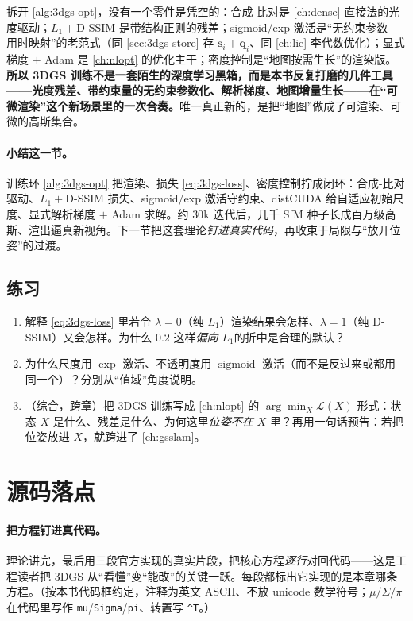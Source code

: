 \begin{insight}
拆开 \cref{alg:3dgs-opt}，没有一个零件是凭空的：合成-比对是 \cref{ch:dense} 直接法的光度驱动；$L_1+$D-SSIM 是带结构正则的残差；sigmoid/exp 激活是“无约束参数 $+$ 用时映射”的老范式（同 \cref{sec:3dgs-store} 存 $\mathbf s_i+\mathbf q_i$、同 \cref{ch:lie} 李代数优化）；显式梯度 $+$ Adam 是 \cref{ch:nlopt} 的优化主干；密度控制是“地图按需生长”的渲染版。\textbf{所以 3DGS 训练不是一套陌生的深度学习黑箱，而是本书反复打磨的几件工具——光度残差、带约束量的无约束参数化、解析梯度、地图增量生长——在“可微渲染”这个新场景里的一次合奏。}唯一真正新的，是把“地图”做成了可渲染、可微的高斯集合。
\end{insight}

\paragraph{小结这一节。}
训练环 \cref{alg:3dgs-opt} 把渲染、损失 \cref{eq:3dgs-loss}、密度控制拧成闭环：合成-比对驱动、$L_1+$D-SSIM 损失、sigmoid/exp 激活守约束、distCUDA 给自适应初始尺度、显式解析梯度 $+$ Adam 求解。约 $30$k 迭代后，几千 SfM 种子长成百万级高斯、渲出逼真新视角。下一节把这套理论\emph{钉进真实代码}，再收束于局限与“放开位姿”的过渡。

\subsection*{练习}
\begin{enumerate}
  \item 解释 \cref{eq:3dgs-loss} 里若令 $\lambda=0$（纯 $L_1$）渲染结果会怎样、$\lambda=1$（纯 D-SSIM）又会怎样。为什么 $0.2$ 这样\emph{偏向 $L_1$}的折中是合理的默认？
  \item 为什么尺度用 $\exp$ 激活、不透明度用 $\operatorname{sigmoid}$ 激活（而不是反过来或都用同一个）？分别从“值域”角度说明。
  \item （综合，跨章）把 3DGS 训练写成 \cref{ch:nlopt} 的 $\arg\min_X\mathcal L(X)$ 形式：状态 $X$ 是什么、残差是什么、为何这里\emph{位姿不在} $X$ 里？再用一句话预告：若把位姿放进 $X$，就跨进了 \cref{ch:gsslam}。
\end{enumerate}

\section{源码落点}
\label{sec:3dgs-code}

\paragraph{把方程钉进真代码。}
理论讲完，最后用三段官方实现的真实片段，把核心方程\emph{逐行}对回代码——这是工程读者把 3DGS 从“看懂”变“能改”的关键一跃。每段都标出它实现的是本章哪条方程。（按本书代码框约定，注释为英文 ASCII、不放 unicode 数学符号；$\mu/\Sigma/\pi$ 在代码里写作 \texttt{mu}/\allowbreak\texttt{Sigma}/\allowbreak\texttt{pi}、转置写 \texttt{\textasciicircum T}。）

